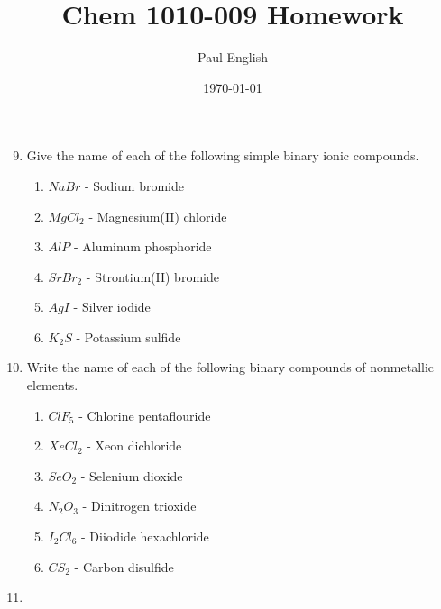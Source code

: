 \documentclass[12pt,letterpaper]{article}
\title{Chem 1010-009 Homework}
\date{\today}
\author{Paul English}
\begin{document}
\maketitle

\begin{enumerate}

\setcounter{enumi}{8} %
\item 

Give the name of each of the following simple binary ionic compounds.

\begin{enumerate}
\item $NaBr$ - Sodium bromide\\
\item $MgCl_2$ - Magnesium(II) chloride\\
\item $AlP$ - Aluminum phosphoride\\
\item $SrBr_2$ - Strontium(II) bromide\\
\item $AgI$ - Silver iodide\\
\item $K_2S$ - Potassium sulfide\\
\end{enumerate}

\setcounter{enumi}{17} %
\item 

Write the name of each of the following binary compounds of nonmetallic elements.

\begin{enumerate}
\item $ClF_5$ - Chlorine pentaflouride\\
\item $XeCl_2$ - Xeon dichloride\\
\item $SeO_2$ - Selenium dioxide\\
\item $N_2O_3$ - Dinitrogen trioxide\\
\item $I_2Cl_6$ - Diiodide hexachloride\\
\item $CS_2$ - Carbon disulfide\\
\end{enumerate}

\setcounter{enumi}{18} %
\item 


\end{enumerate}
\end{document}
